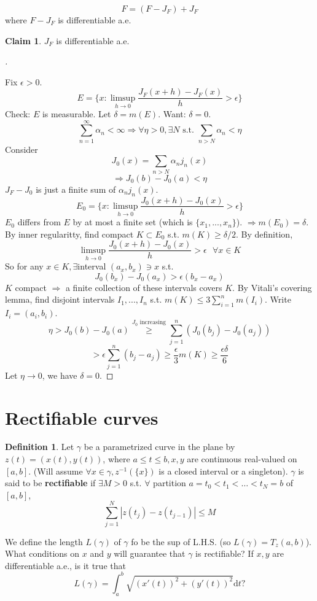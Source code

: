 \documentclass{article}
\theoremstyle{definition}
\newtheorem{dfn}{Definition}
\newtheorem*{clm}{Claim}
\newenvironment{proofs}[1][\proofname]{%
  \begin{proof}[#1]$ $\par\nobreak\ignorespaces
}{%
  \end{proof}
}
\newcommand{\sfa}{\text{  } \forall}
\begin{document}
\[
  F = (F - J_F) + J_F
\]
where $F - J_F$ is differentiable a.e.

\begin{clm}
  $J_F$ is differentiable a.e.
\end{clm}

\begin{proofs}
  Fix $\epsilon > 0$. 
  \[
    E = \{x: \limsup_{h \to 0} \frac{J_F(x + h) - J_F(x)}{h} > \epsilon\}
  \]
  Check: $E$ is measurable. Let $\delta = m(E)$. Want: $\delta = 0$.
  \[
    \sum_{n = 1}^\infty \alpha_n < \infty \Rightarrow \forall \eta > 0, \exists N \text{ s.t. } \sum_{n > N} \alpha_n < \eta
  \]
  Consider
  \[
    J_0(x) = \sum_{n > N} \alpha_nj_n(x)
  \]
  \[
    \Rightarrow J_0(b) - J_0(a) < \eta
  \]
  $J_F - J_0$ is just a finite sum of $\alpha_n j_n(x)$.
  \[
    E_0 = \{x: \limsup_{h \to 0} \frac{J_0(x + h) - J_0(x)}{h} > \epsilon\}
  \]
  $E_0$ differs from $E$ by at most a finite set (which is $\{x_1, ..., x_n\}$). $\Rightarrow m(E_0) = \delta$. By inner regularitty, find compact $K \subset E_0$ s.t. $m(K) \geq \delta/2$. By definition, 
  \[
    \limsup_{h \to 0} \frac{J_0(x + h) - J_0(x)}{h} > \epsilon \sfa x \in K
  \]
  So for any $x \in K, \exists $interval $(a_x, b_x) \ni x$ s.t.
  \[
    J_0(b_x) - J_0(a_x) > \epsilon(b_x - a_x)
  \]
  $K$ compact $\Rightarrow $ a finite collection of these intervals covers $K$. By Vitali's covering lemma, find disjoint intervals $I_1, ..., I_n$ s.t. $m(K) \leq 3 \sum_{i = 1}^n m(I_i)$. Write $I_i = (a_i, b_i)$. 
  \[
    \eta > J_0(b) - J_0(a) \stackrel{J_0 \text{ increasing}}{\geq} \sum_{j = 1}^n (J_0(b_j) - J_0(a_j)) 
  \]
  \[
    > \epsilon \sum_{j = 1}^n (b_j - a_j) \geq \frac{\epsilon}{3} m(K) \geq \frac{\epsilon \delta}{6}
  \]
  Let $\eta \to 0$, we have $\delta = 0$. 
\end{proofs}

\section{Rectifiable curves}

\begin{dfn}
	Let $\gamma$ be a parametrized curve in the plane by $z(t) = (x(t), y(t))$, where $a \leq t \leq b, x, y$ are continuous real-valued on $[a, b]$. (Will assume $\forall x \in \gamma, z^{-1}(\{x\})$ is a closed interval or a singleton). $\gamma$ is said to be \textbf{rectifiable} if $\exists M > 0$ s.t. $\forall$ partition $a = t_0 < t_1 < \hdots < t_N = b$ of $[a, b]$, 
  \[
    \sum_{j = 1}^N |z(t_j) - z(t_{j - 1})| \leq M
  \]
\end{dfn}
We define the length $L(\gamma)$ of $\gamma$ fo be the sup of L.H.S. (so $L(\gamma) = T_z(a, b)$). What conditions on $x$ and $y$ will guarantee that $\gamma$ is rectifiable? If $x, y$ are differentiable a.e., is it true that
\[
  L(\gamma) = \int_a^b \sqrt{(x'(t))^2 + (y'(t))^2} \mathrm{d} t \text{?}
\]
\end{document}
